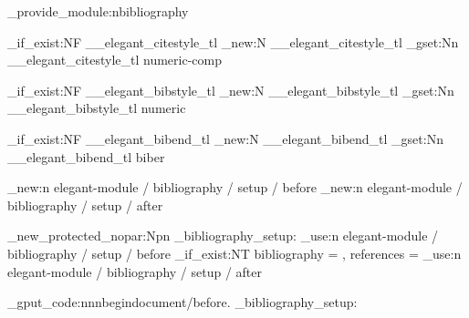 \elegant_provide_module:n{bibliography}


\tl_if_exist:NF \g__elegant_citestyle_tl
  {
    \tl_new:N \g__elegant_citestyle_tl
    \tl_gset:Nn \g__elegant_citestyle_tl { numeric-comp }
  }

\tl_if_exist:NF \g__elegant_bibstyle_tl
  {
    \tl_new:N \g__elegant_bibstyle_tl
    \tl_gset:Nn \g__elegant_bibstyle_tl { numeric }
  }

\tl_if_exist:NF \g__elegant_bibend_tl
  {
    \tl_new:N \g__elegant_bibend_tl
    \tl_gset:Nn \g__elegant_bibend_tl { biber }
  }


\hook_new:n { elegant-module / bibliography / setup / before }
\hook_new:n { elegant-module / bibliography / setup / after }


\RequirePackage
  [
    backend   = \g__elegant_bibend_tl,
    citestyle = \g__elegant_citestyle_tl,
    bibstyle  = \g__elegant_bibstyle_tl
  ]
  { biblatex }


\cs_new_protected_nopar:Npn \elegant_bibliography_setup:
  {
    \hook_use:n { elegant-module / bibliography / setup / before }
    \cs_if_exist:NT \ebibname
      {
          {
            bibliography = { \ebibname },
            references   = { \ebibname }
          }
      }
    \hook_use:n { elegant-module / bibliography / setup / after }
  }


\hook_gput_code:nnn{begindocument/before}{.}
  { \elegant_bibliography_setup: }


\endinput
